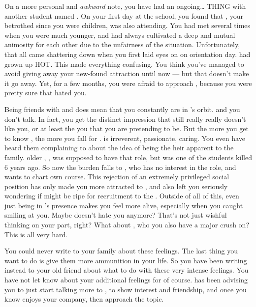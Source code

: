 \documentclass[char]{GL2020}
\begin{document}
On a more personal and \emph{awkward} note, you have had an ongoing\ldots{} THING with another student named \cHeir{\full}. On your first day at the school, you found that \cHeir{}, your betrothed since you were children, was also attending. You had met several times when you were much younger, and had always cultivated a deep and mutual animosity for each other due to the unfairness of the situation. Unfortunately, that all came shattering down when you first laid eyes on \cHeir{\them} on orientation day. \cHeir{} had grown up HOT. This made everything confusing. You think you've managed to avoid giving away your new-found attraction until now — but that doesn't make it go away. Yet, for a few months, you were afraid to approach \cHeir{\them}, because you were pretty sure that \cHeir{\they} hated you. 

Being friends with \cAmbition{} and \cPresident{} does mean that you constantly are in \cHeir{}’s orbit. \cHeir{} and you don’t talk. In fact, you get the distinct impression that \cHeir{} still really really doesn’t like you, or at least the you that you are pretending to be. But the more you get to know \cHeir{\them}, the more you fall for \cHeir{\them}. \cHeir{} is irreverent, passionate, caring. You even have heard them complaining to \cAmbition{} about the idea of being the heir apparent to the \cHeir{\formal} family. \cHeir{\Their} older \cHeirSibling{\sibling}, \cHeirSibling{\intro}, was supposed to have that role, but \cHeirSibling{} was one of the students killed 6 years ago. So now the burden falls to \cHeir{}, who has no interest in the role, and wants to chart \cHeir{\their} own course. This rejection of an extremely privileged social position has only made you more attracted to \cHeir{\them}, and also left you seriously wondering if \cHeir{\they} might be ripe for recruitment to the \pGoaties{}. Outside of all of this, even just being in \cHeir{}'s presence makes you feel more alive, especially when you caught \cHeir{\them} smiling at you. Maybe \cHeir{} doesn’t hate you anymore?  That’s not just wishful thinking on your part, right? What about \cPresident{}, who you also have a major crush on?  This is all very hard. 

You could never write to your family about these feelings. The last thing you want to do is give them more ammunition in your life. So you have been writing instead to your old friend \cWildCard{} about what to do with these very intense feelings. You have not let \cWildCard{} know about your additional feelings for \cPresident{} of course. \cWildCard{} has been advising you to just start talking more to \cHeir{}, to show interest and friendship, and once you know \cHeir{} enjoys your company, then approach the topic. 
\end{document}
